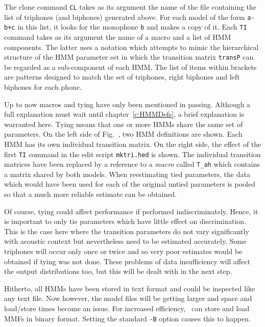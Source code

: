 The clone command \texttt{CL} takes as its
argument the name of the file containing the list of triphones (and
biphones) generated
above.  For each model of the form \texttt{a-b+c} in this list, it looks for
the monophone \texttt{b} and makes a copy of it. Each \texttt{TI} command takes as its argument the name of a macro
and a list of HMM components.  The latter uses a notation which attempts to
mimic the hierarchical structure of the HMM parameter set in which the
transition matrix \texttt{transP} can be regarded as a sub-component of each
HMM.  The list of items within brackets are patterns designed to match the set
of triphones, right biphones and left biphones for each phone.


Up to now macros and tying have only been mentioned in passing.  Although a
full explanation must wait until chapter~\ref{c:HMMDefs}, a brief explanation
is warranted here.  Tying means that one or more HMMs share the same set of
parameters.  On the left side of Fig.~\href{f:egtranstie}, two HMM definitions
are shown.  Each HMM has its own individual transition matrix.  On the right
side, the effect of the first \texttt{TI} command in the edit script
\texttt{mktri.hed} is shown.  The individual transition matrices have been
replaced by a reference to a \textit{macro} called \texttt{T\_ah} which
contains a matrix shared by both models.  When reestimating tied parameters,
the data which would have been used for each of the original untied parameters
is pooled so that a much more reliable estimate can be obtained.

Of course, tying could affect performance if performed indiscriminately.
Hence, it is important to only tie parameters which have little effect on
discrimination.  This is the case here where the transition parameters do not
vary significantly with acoustic context but nevertheless need to be estimated
accurately.  Some triphones will occur only once or twice and so very poor
estimates would be obtained if tying was not done.  These problems of data
insufficiency will affect the output distributions too, but this will be dealt
with in the next step.

Hitherto, all HMMs have been stored in text format and could be inspected like
any text file.  Now however, the model files will be getting larger and space
and load/store times become an issue.  For increased efficiency,
\HTK\ can store and load MMFs in binary
format.  Setting the standard \texttt{-B} option causes this to happen.

